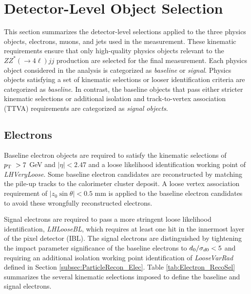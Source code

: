 \section{Detector-Level Object Selection}
\label{sec:ObjReconstruction}

This section summarizes the detector-level selections applied to the three physics objects, electrons, muons, and jets used in the measurement. These kinematic requirements ensure that only high-quality physics objects relevant to the $ZZ^*(\rightarrow 4\ell) jj$ production are selected for the final measurement. Each physics object considered in the analysis is categorized as \textit{baseline} or \textit{signal}. Physics objects satisfying a set of kinematic selections or looser identification criteria are categorized as \textit{baseline}. In contrast, the baseline objects that pass either stricter kinematic selections or additional isolation and track-to-vertex association (TTVA) requirements are categorized as \textit{signal objects}.

\subsection{Electrons}
\label{subsec:ElecRecon}

Baseline electron objects are required to satisfy the kinematic selections of $p_{\textrm{T} ~} > 7$ GeV and $|\eta| < 2.47$ and a loose likelihood identification working point of \textit{LHVeryLoose}. Some baseline electron candidates are reconstructed by matching the pile-up tracks to the calorimeter cluster deposit. A loose vertex association requirement of $|z_{0}\sin\theta| < 0.5 $ mm is applied to the baseline electron candidates to avoid these wrongfully reconstructed electrons. 

Signal electrons are required to pass a more stringent loose likelihood identification, \textit{LHLooseBL}, which requires at least one hit in the innermost layer of the pixel detector (IBL). The signal electrons are distinguished by tightening the impact parameter significance of the baseline electrons to $d_{0}/ \sigma_{d0} < 5$ and requiring an additional isolation working point identification of \textit{LooseVarRad} defined in Section \ref{subsec:ParticleRecon_Elec}. Table \ref{tab:Electron_RecoSel} summarizes the several kinematic selections imposed to define the baseline and signal electrons.

